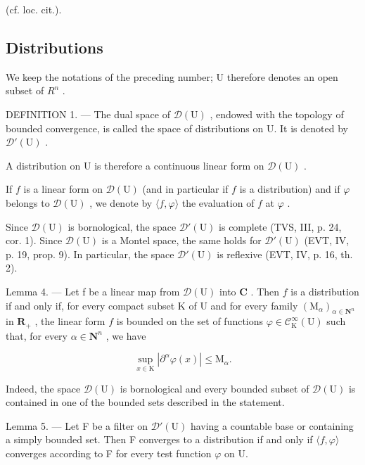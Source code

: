 (cf. loc. cit.).

\subsection{Distributions}

We keep the notations of the preceding number; U therefore denotes an open subset of \(R^{n}\) .

DEFINITION 1. --- The dual space of \(\mathcal{D}(\mathrm{U})\) , endowed with the topology of bounded convergence, is called the space of distributions on U. It is denoted by \(\mathcal{D}'(\mathrm{U})\) .

A distribution on U is therefore a continuous linear form on \(\mathcal{D}(\mathrm{U})\) .

If \(f\) is a linear form on \(\mathcal{D}(\mathrm{U})\) (and in particular if \(f\) is a distribution) and if \(\varphi\) belongs to \(\mathcal{D}(\mathrm{U})\) , we denote by \(\langle f, \varphi \rangle\) the evaluation of \(f\) at \(\varphi\) .

Since \(\mathcal{D}(\mathrm{U})\) is bornological, the space \(\mathcal{D}'(\mathrm{U})\) is complete (TVS, III, p. 24, cor. 1). Since \(\mathcal{D}(\mathrm{U})\) is a Montel space, the same holds for \(\mathcal{D}'(\mathrm{U})\) (EVT, IV, p. 19, prop. 9). In particular, the space \(\mathcal{D}'(\mathrm{U})\) is reflexive (EVT, IV, p. 16, th. 2).

Lemma 4. --- Let f be a linear map from \(\mathcal{D}(\mathrm{U})\) into \(\mathbf{C}\) . Then \(f\) is a distribution if and only if, for every compact subset \(\mathrm{K}\) of \(\mathrm{U}\) and for every family \((\mathrm{M}_{\alpha})_{\alpha \in \mathbf{N}^{n}}\) in \(\mathbf{R}_{+}\) , the linear form \(f\) is bounded on the set of functions \(\varphi \in \mathcal{C}_{\mathrm{K}}^{\infty}(\mathrm{U})\) such that, for every \(\alpha \in \mathbf{N}^{n}\) , we have

\[
\sup _ {x \in \mathrm{K}} | \partial^ {\alpha} \varphi (x) | \leqslant \mathrm{M} _ {\alpha}.
\]

Indeed, the space \(\mathcal{D}(\mathrm{U})\) is bornological and every bounded subset of \(\mathcal{D}(\mathrm{U})\) is contained in one of the bounded sets described in the statement.

Lemma 5. --- Let F be a filter on \(\mathcal{D}'(\mathrm{U})\) having a countable base or containing a simply bounded set. Then F converges to a distribution if and only if \(\langle f, \varphi \rangle\) converges according to F for every test function \(\varphi\) on U.

